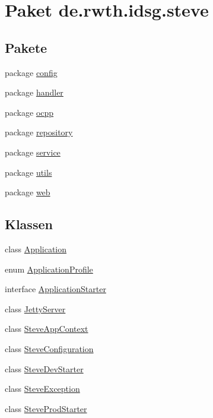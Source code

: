 \hypertarget{namespacede_1_1rwth_1_1idsg_1_1steve}{\section{Paket de.\-rwth.\-idsg.\-steve}
\label{namespacede_1_1rwth_1_1idsg_1_1steve}
}
\subsection*{Pakete}
\begin{DoxyCompactItemize}
\item 
package \hyperlink{namespacede_1_1rwth_1_1idsg_1_1steve_1_1config}{config}
\item 
package \hyperlink{namespacede_1_1rwth_1_1idsg_1_1steve_1_1handler}{handler}
\item 
package \hyperlink{namespacede_1_1rwth_1_1idsg_1_1steve_1_1ocpp}{ocpp}
\item 
package \hyperlink{namespacede_1_1rwth_1_1idsg_1_1steve_1_1repository}{repository}
\item 
package \hyperlink{namespacede_1_1rwth_1_1idsg_1_1steve_1_1service}{service}
\item 
package \hyperlink{namespacede_1_1rwth_1_1idsg_1_1steve_1_1utils}{utils}
\item 
package \hyperlink{namespacede_1_1rwth_1_1idsg_1_1steve_1_1web}{web}
\end{DoxyCompactItemize}
\subsection*{Klassen}
\begin{DoxyCompactItemize}
\item 
class \hyperlink{classde_1_1rwth_1_1idsg_1_1steve_1_1_application}{Application}
\item 
enum \hyperlink{enumde_1_1rwth_1_1idsg_1_1steve_1_1_application_profile}{Application\-Profile}
\item 
interface \hyperlink{interfacede_1_1rwth_1_1idsg_1_1steve_1_1_application_starter}{Application\-Starter}
\item 
class \hyperlink{classde_1_1rwth_1_1idsg_1_1steve_1_1_jetty_server}{Jetty\-Server}
\item 
class \hyperlink{classde_1_1rwth_1_1idsg_1_1steve_1_1_steve_app_context}{Steve\-App\-Context}
\item 
class \hyperlink{classde_1_1rwth_1_1idsg_1_1steve_1_1_steve_configuration}{Steve\-Configuration}
\item 
class \hyperlink{classde_1_1rwth_1_1idsg_1_1steve_1_1_steve_dev_starter}{Steve\-Dev\-Starter}
\item 
class \hyperlink{classde_1_1rwth_1_1idsg_1_1steve_1_1_steve_exception}{Steve\-Exception}
\item 
class \hyperlink{classde_1_1rwth_1_1idsg_1_1steve_1_1_steve_prod_starter}{Steve\-Prod\-Starter}
\end{DoxyCompactItemize}
